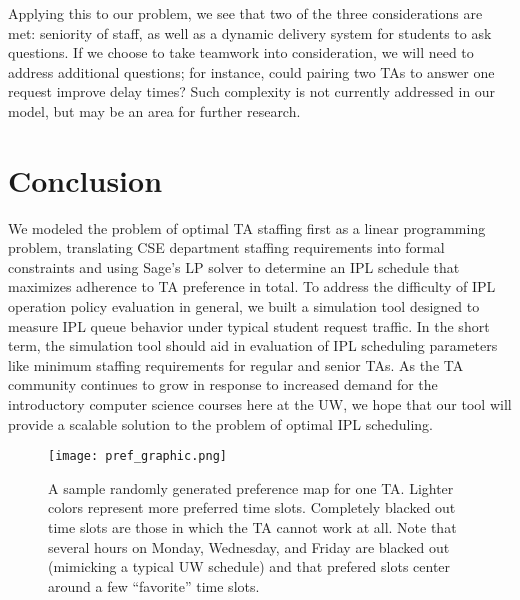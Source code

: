 \documentclass{article}
\begin{document}
\begin{multicols}{2}
Applying this to our problem, we see that two of the three considerations are met: seniority of staff, as well as a dynamic delivery system for students to ask questions. If we choose to take teamwork into consideration, we will need to address additional questions; for instance, could pairing two TAs to answer one request improve delay times? Such complexity is not currently addressed in our model, but may be an area for further research.

\section*{Conclusion}

We modeled the problem of optimal TA staffing first as a linear programming problem, translating CSE department staffing requirements into formal constraints and using Sage's LP solver to determine an IPL schedule that maximizes adherence to TA preference in total. To address the difficulty of IPL operation policy evaluation in general, we built a simulation tool designed to measure IPL queue behavior under typical student request traffic. In the short term, the simulation tool should aid in evaluation of IPL scheduling parameters like minimum staffing requirements for regular and senior TAs. As the TA community continues to grow in response to increased demand for the introductory computer science courses here at the UW, we hope that our tool will provide a scalable solution to the problem of optimal IPL scheduling.




\begin{figure*}
\centering
\texttt{[image: pref\_graphic.png]}
\caption{\small{A sample randomly generated preference map for one TA. Lighter colors represent more preferred time slots. Completely blacked out time slots are those in which the TA cannot work at all. Note that several hours on Monday, Wednesday, and Friday are blacked out (mimicking a typical UW schedule) and that prefered slots center around a few ``favorite'' time slots.}}
\end{figure*}


\end{multicols}
\end{document}
